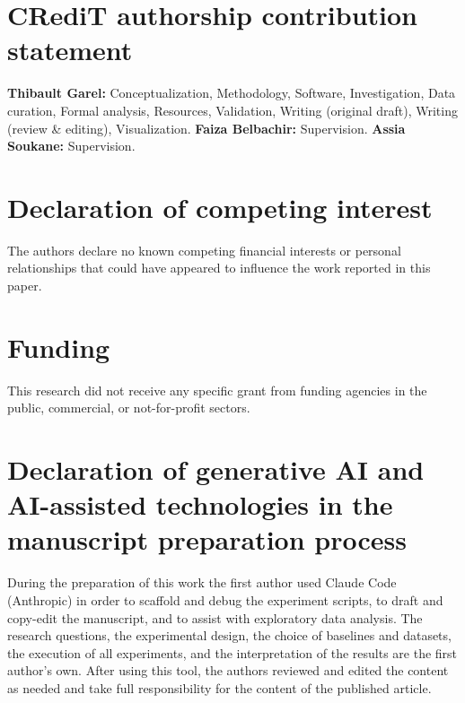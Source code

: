 
\section*{CRediT authorship contribution statement}
\label{sec:credit}
\textbf{Thibault Garel:} Conceptualization, Methodology, Software, Investigation, Data curation, Formal analysis, Resources, Validation,  Writing (original draft), Writing (review \& editing), Visualization.
\textbf{Faiza Belbachir:} Supervision.
\textbf{Assia Soukane:} Supervision.

\section*{Declaration of competing interest}
\label{sec:competing}
The authors declare no known competing financial interests or personal relationships that could have appeared to influence the work reported in this paper.

\section*{Funding}
\label{sec:funding}
This research did not receive any specific grant from funding agencies in the public, commercial, or not-for-profit sectors.

\section*{Declaration of generative AI and AI-assisted technologies in the manuscript preparation process}
\label{sec:genai}
During the preparation of this work the first author used Claude Code (Anthropic) in order to scaffold and debug the experiment scripts, to draft and copy-edit the manuscript, and to assist with exploratory data analysis.
The research questions, the experimental design, the choice of baselines and datasets, the execution of all experiments, and the interpretation of the results are the first author's own.
After using this tool, the authors reviewed and edited the content as needed and take full responsibility for the content of the published article.

